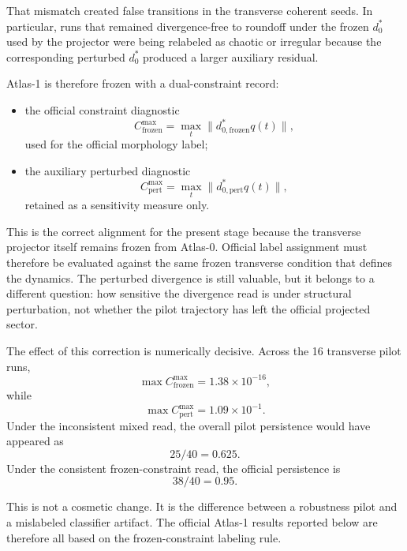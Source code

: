 \documentclass[11pt]{article}
\begin{document}
That mismatch created false transitions in the transverse coherent seeds. In particular, runs that remained divergence-free to roundoff under the frozen $d_0^{*}$ used by the projector were being relabeled as chaotic or irregular because the corresponding perturbed $d_0^{*}$ produced a larger auxiliary residual.

Atlas-1 is therefore frozen with a dual-constraint record:
\begin{itemize}
\item the official constraint diagnostic
\begin{equation}
C_{\mathrm{frozen}}^{\max} = \max_t \|d_{0,\mathrm{frozen}}^{*} q(t)\|,
\end{equation}
used for the official morphology label;
\item the auxiliary perturbed diagnostic
\begin{equation}
C_{\mathrm{pert}}^{\max} = \max_t \|d_{0,\mathrm{pert}}^{*} q(t)\|,
\end{equation}
retained as a sensitivity measure only.
\end{itemize}

This is the correct alignment for the present stage because the transverse projector itself remains frozen from Atlas-0. Official label assignment must therefore be evaluated against the same frozen transverse condition that defines the dynamics. The perturbed divergence is still valuable, but it belongs to a different question: how sensitive the divergence read is under structural perturbation, not whether the pilot trajectory has left the official projected sector.

The effect of this correction is numerically decisive. Across the 16 transverse pilot runs,
\begin{equation}
\max C_{\mathrm{frozen}}^{\max} = 1.38 \times 10^{-16},
\end{equation}
while
\begin{equation}
\max C_{\mathrm{pert}}^{\max} = 1.09 \times 10^{-1}.
\end{equation}
Under the inconsistent mixed read, the overall pilot persistence would have appeared as
\begin{equation}
25/40 = 0.625.
\end{equation}
Under the consistent frozen-constraint read, the official persistence is
\begin{equation}
38/40 = 0.95.
\end{equation}

This is not a cosmetic change. It is the difference between a robustness pilot and a mislabeled classifier artifact. The official Atlas-1 results reported below are therefore all based on the frozen-constraint labeling rule.
\end{document}
